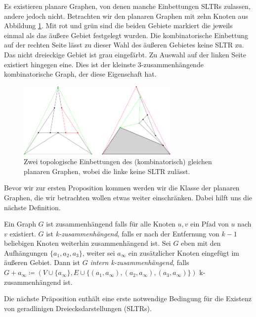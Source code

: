 \begin{example}\label{bsp1}
Es existieren planare Graphen, von denen manche Einbettungen SLTRs zulassen, andere jedoch nicht. Betrachten wir den planaren Graphen mit zehn Knoten aus Abbildung \ref{10_example}. Mit rot und grün sind die beiden Gebiete markiert die jeweils einmal als das äußere Gebiet festgelegt wurden. Die kombinatorische Einbettung auf der rechten Seite lässt zu dieser Wahl des äußeren Gebietes keine SLTR zu. Das nicht dreieckige Gebiet ist grau eingefärbt. Zu Auswahl auf der linken Seite existiert hingegen eine. Dies ist der kleinste 3-zusammenhängende kombinatorische Graph, der diese Eigenschaft hat.

\begin{figure}[h]
\centering
\includegraphics[width=0.7\textwidth]{10_example.png}
\caption{Zwei topologische Einbettungen des (kombinatorisch) gleichen planaren Graphen, wobei die linke keine SLTR zulässt.}
\label{10_example}
\end{figure}

\end{example}

Bevor wir zur ersten Proposition kommen werden wir die Klasse der planaren Graphen, die wir betrachten wollen etwas weiter einschränken. Dabei hilft uns die nächste Definition.

\begin{definition}\label{int_3_con}
Ein Graph $G$ ist zusammenhängend falls für alle Knoten $u,v$ ein Pfad von $u$ nach $v$ existiert. $G$ ist \textit{k-zusammenhängend}, falls er nach der Entfernung von $k-1$ beliebigen Knoten weiterhin zusammenhängend ist. Sei $G$ eben mit den Aufhängungen $\{a_1,a_2,a_3\}$, weiter sei $a_\infty$ ein zusätzlicher Knoten eingefügt im äußeren Gebiet. Dann ist $G$ \textit{intern k-zusammenhängend}, falls $G+a_\infty\coloneqq(V\cup\{a_\infty \},E\cup \{(a_1,a_\infty),(a_2,a_\infty),(a_3,a_\infty)\})$ k-zusammenhängend ist.
\end{definition}

Die nächste Präposition enthält eine erste notwendige Bedingung für die Existenz von geradlinigen Dreiecksdarstellungen (SLTRs).


